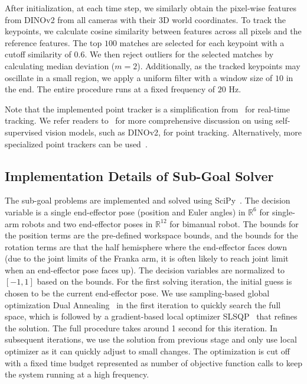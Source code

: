 After initialization, at each time step, we similarly obtain the pixel-wise features from DINOv2 from all cameras with their 3D world coordinates.
To track the keypoints, we calculate cosine similarity between features across all pixels and the reference features. The top $100$ matches are selected for each keypoint with a cutoff similarity of $0.6$. We then reject outliers for the selected matches by calculating median deviation ($m=2$). Additionally, as the tracked keypoints may oscillate in a small region, we apply a uniform filter with a window size of $10$ in the end. The entire procedure runs at a fixed frequency of $20$ Hz.

Note that the implemented point tracker is a simplification from~\cite{wang2023d3fields} for real-time tracking. We refer readers to~\cite{wang2023d3fields} for more comprehensive discussion on using self-supervised vision models, such as DINOv2, for point tracking.
Alternatively, more specialized point trackers can be used~\cite{harley2022particle,wang2023tracking,zheng2023pointodyssey,karaev2023cotracker,doersch2023tapir,doersch2024bootstap,xiao2024spatialtracker,luiten2023dynamic}.

\subsection{Implementation Details of Sub-Goal Solver}\label{app:subgoal}
The sub-goal problems are implemented and solved using SciPy~\cite{virtanen2020scipy}.
The decision variable is a single end-effector pose (position and Euler angles) in $\mathbb{R}^6$ for single-arm robots and two end-effector poses in $\mathbb{R}^{12}$ for bimanual robot.
The bounds for the position terms are the pre-defined workspace bounds, and the bounds for the rotation terms are that the half hemisphere where the end-effector faces down (due to the joint limits of the Franka arm, it is often likely to reach joint limit when an end-effector pose faces up).
The decision variables are normalized to $[-1, 1]$ based on the bounds.
For the first solving iteration, the initial guess is chosen to be the current end-effector pose.
We use sampling-based global optimization Dual Annealing~\cite{xiang1997generalized} in the first iteration to quickly search the full space, which is followed by a gradient-based local optimizer SLSQP~\cite{kraft1988software} that refines the solution.
The full procedure takes around 1 second for this iteration.
In subsequent iterations, we use the solution from previous stage and only use local optimizer as it can quickly adjust to small changes.
The optimization is cut off with a fixed time budget represented as number of objective function calls to keep the system running at a high frequency.

